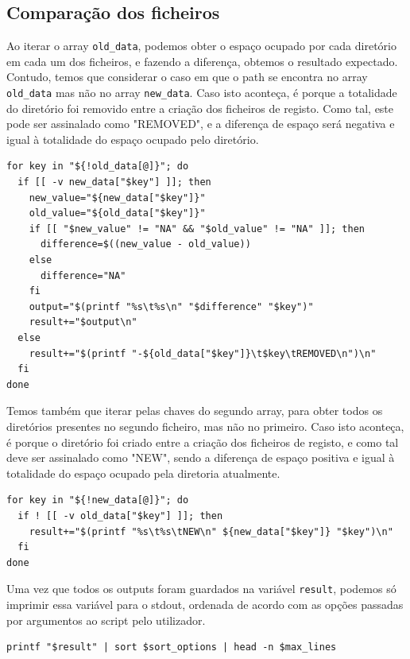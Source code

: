\subsection{Comparação dos ficheiros}
Ao iterar o array \verb|old_data|, podemos obter o espaço
ocupado por cada diretório em cada um dos ficheiros, e
fazendo a diferença, obtemos o resultado expectado. Contudo,
temos que considerar o caso em que o path se encontra no
array \verb|old_data| mas não no array \verb|new_data|. Caso
isto aconteça, é porque a totalidade do diretório foi
removido entre a criação dos ficheiros de registo. Como tal,
este pode ser assinalado como "REMOVED", e a diferença de
espaço será negativa e igual à totalidade do espaço ocupado pelo diretório.
\begin{verbatim}
for key in "${!old_data[@]}"; do
  if [[ -v new_data["$key"] ]]; then
    new_value="${new_data["$key"]}"
    old_value="${old_data["$key"]}"
    if [[ "$new_value" != "NA" && "$old_value" != "NA" ]]; then
      difference=$((new_value - old_value))
    else
      difference="NA"
    fi
    output="$(printf "%s\t%s\n" "$difference" "$key")"
    result+="$output\n"
  else
    result+="$(printf "-${old_data["$key"]}\t$key\tREMOVED\n")\n"
  fi
done
\end{verbatim}
Temos também que iterar pelas chaves do segundo array,
para obter todos os diretórios presentes no segundo
ficheiro, mas não no primeiro.
Caso isto aconteça, é porque o diretório foi criado entre a
criação dos ficheiros de registo, e como tal deve ser
assinalado como "NEW", sendo a diferença de espaço positiva
e igual à totalidade do espaço ocupado pela diretoria
atualmente.
\begin{verbatim}
for key in "${!new_data[@]}"; do
  if ! [[ -v old_data["$key"] ]]; then
    result+="$(printf "%s\t%s\tNEW\n" ${new_data["$key"]} "$key")\n"
  fi
done
\end{verbatim}

Uma vez que todos os outputs foram guardados na variável
\verb|result|, podemos só imprimir essa variável para o
stdout, ordenada de acordo com as opções passadas por
argumentos ao script pelo utilizador.
\begin{verbatim}
printf "$result" | sort $sort_options | head -n $max_lines
\end{verbatim}
